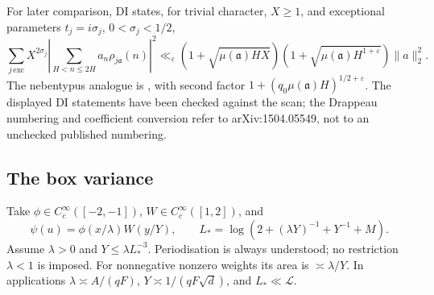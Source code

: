 \documentclass[10pt,reqno]{amsart}
\theoremstyle{definition}
\numberwithin{equation}{section}
\newcommand{\cL}{\mathcal L}
\begin{document}
For later comparison, DI \cite[Theorem 5, (1.38), p.~232]{DI} states,
for trivial character, \(X\ge1\), and exceptional parameters
\(t_j=i\sigma_j\), \(0<\sigma_j<1/2\),
\begin{equation}\label{B:eq:exceptional-sieve}
 \sum_{j\,\mathrm{exc}}X^{2\sigma_j}
   \left|\sum_{H<n\le2H}a_n\rho_{j\mathfrak a}(n)\right|^2
 \ll_\varepsilon
 (1+\sqrt{\mu(\mathfrak a)HX})
 (1+\sqrt{\mu(\mathfrak a)H^{1+\varepsilon}})\|a\|_2^2.
\end{equation}
The nebentypus analogue is \cite[Lemma 4.8]{Dr}, with second factor
\(1+(q_0\mu(\mathfrak a)H)^{1/2+\varepsilon}\).
The displayed DI statements have been checked against the scan; the
Drappeau numbering and coefficient conversion refer to arXiv:1504.05549,
not to an unchecked published numbering.

\subsection*{The box variance}
Take \(\phi\in C_c^\infty([-2,-1])\), \(W\in C_c^\infty([1,2])\), and
\[
 \psi(u)=\phi(x/\lambda)W(y/Y),\qquad
 L_* =\log(2+(\lambda Y)^{-1}+Y^{-1}+M).
\]
Assume \(\lambda>0\) and \(Y\le\lambda L_*^{-3}\). Periodisation is always
understood; no restriction \(\lambda<1\) is imposed. For nonnegative
nonzero weights its area is \(\asymp\lambda/Y\). In applications
\(\lambda\asymp A/(qF)\), \(Y\asymp1/(qF\sqrt d)\), and \(L_*\ll\cL\).
\end{document}
